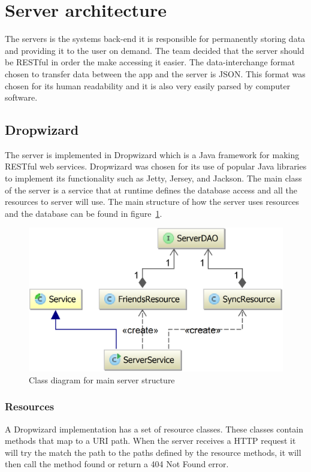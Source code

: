 \section{Server architecture}
The servers is the systems back-end it is responsible for permanently storing data and providing it to the user on demand. The team decided that the server should be RESTful in order the make accessing it easier. The data-interchange format chosen to transfer data between the app and the server is JSON. This format was chosen for its human readability and it is also very easily parsed by computer software.

\subsection{Dropwizard}
The server is implemented in Dropwizard which is a Java framework for making RESTful web services. Dropwizard was chosen for its use of popular Java libraries to implement its functionality such as Jetty, Jersey, and Jackson. The main class of the server is a service that at runtime defines the database access and all the resources to server will use. The main structure of how the server uses resources and the database can be found in figure~\ref{fig:classDiagramServer}.

\begin{figure}[H]
\includegraphics[width=\textwidth]{ch/architecture/fig/classDiagramServer.png}
\caption{Class diagram for main server structure}
\label{fig:classDiagramServer}
\end{figure}

\subsubsection{Resources}
A Dropwizard implementation has a set of resource classes. These classes contain methods that map to a URI path. When the server receives a HTTP request it will try the match the path to the paths defined by the resource methods, it will then call the method found or return a 404 Not Found error.

